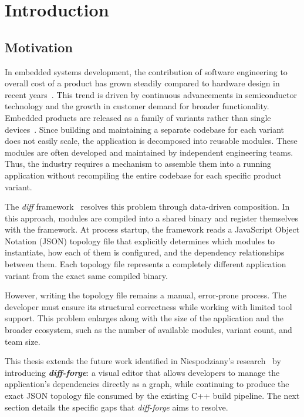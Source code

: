 \clearpage
\section{Introduction}

\subsection{Motivation}
In embedded systems development, the contribution of software engineering to overall cost of a product has grown steadily compared to hardware design in recent years~\cite{niespodziany2025}. This trend is driven by continuous advancements in semiconductor technology and the growth in customer demand for broader functionality. Embedded products are released as a family of variants rather than single devices~\cite{clements2001spl}. Since building and maintaining a separate codebase for each variant does not easily scale, the application is decomposed into reusable modules. These modules are often developed and maintained by independent engineering teams. Thus, the industry requires a mechanism to assemble them into a running application without recompiling the entire codebase for each specific product variant.

The \textit{diff} framework~\cite{niespodziany2025} resolves this problem through data-driven composition. In this approach, modules are compiled into a shared binary and register themselves with the framework. At process startup, the framework reads a JavaScript Object Notation (JSON) topology file that explicitly determines which modules to instantiate, how each of them is configured, and the dependency relationships between them. Each topology file represents a completely different application variant from the exact same compiled binary.

However, writing the topology file remains a manual, error-prone process. The developer must ensure its structural correctness while working with limited tool support. This problem enlarges along with the size of the application and the broader ecosystem, such as the number of available modules, variant count, and team size.

This thesis extends the future work identified in Niespodziany's research~\cite{niespodziany2025} by introducing \textbf{\textit{diff-forge}}: a visual editor that allows developers to manage the application's dependencies directly as a graph, while continuing to produce the exact JSON topology file consumed by the existing C++ build pipeline. The next section details the specific gaps that \textit{diff-forge} aims to resolve.

